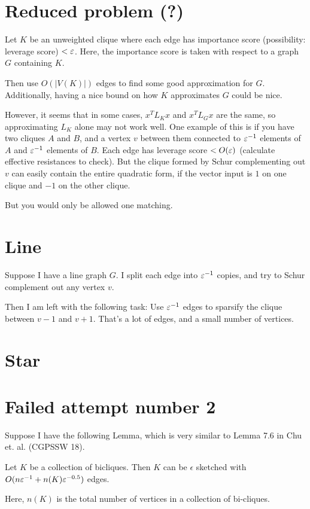 

\section{Reduced problem (?)}
Let $K$ be an unweighted clique where each edge has importance score
(possibility: leverage score) $< \varepsilon$.
Here, the importance score is taken with respect to a graph $G$
containing $K$.

Then use $O(|V(K)|)$ edges to find some good approximation for $G$.
Additionally, having a nice bound on how $K$ approximates $G$ could be
nice.

However, it seems that in some cases, $x^T L_K x$ and $x^T L_G x$ are
the same, so approximating $L_K$ alone may not work well. One example of
this is if you have two cliques $A$ and $B$, and a vertex $v$ between
them connected to $\varepsilon^{-1}$ elements of $A$ and $\varepsilon^{-1}$ elements
of $B$. Each edge has leverage score $< O(\varepsilon)$ (calculate effective
resistances to check). But the clique formed by Schur complementing out
$v$ can easily contain the entire quadratic form, if the vector input is
$1$ on one clique and $-1$ on the other clique.

But you would only be allowed one matching.

\section{Line}
Suppose I have a line graph $G$. I split each edge into $\varepsilon^{-1}$
copies, and try to Schur complement out any vertex $v$.

Then I am left with the following task: Use $\varepsilon^{-1}$ edges to
sparsify the clique between $v-1$ and $v+1$. That's a lot of edges, and
a small number of vertices.
\section{Star}
\section{Failed attempt number 2}
Suppose I have the following Lemma, which is very similar to Lemma 7.6
in Chu et. al. (CGPSSW 18).

\begin{lemma} Let $K$ be a collection of bicliques. Then $K$ can be 
  $\epsilon$ sketched with
  $O(n \varepsilon^{-1} + n(K) \varepsilon^{-0.5})$ edges.
\end{lemma}
Here, $n(K)$ is the total number of vertices in a collection of
bi-cliques.

